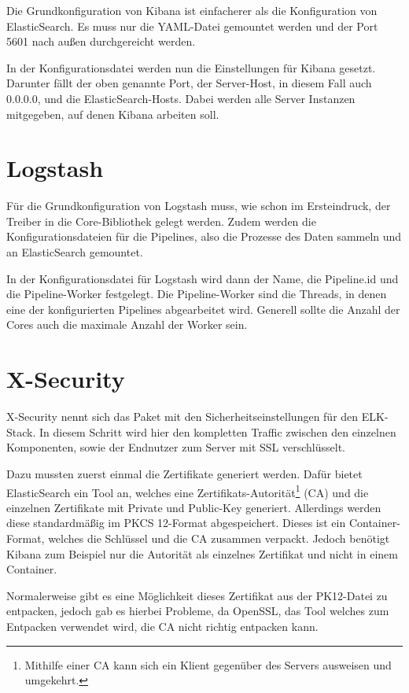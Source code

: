 Die Grundkonfiguration von Kibana ist einfacherer als die Konfiguration von ElasticSearch. Es muss nur die YAML-Datei gemountet werden und der Port 5601 nach außen durchgereicht werden.

In der Konfigurationsdatei werden nun die Einstellungen für Kibana gesetzt. Darunter fällt der oben genannte Port, der Server-Host, in diesem Fall auch 0.0.0.0, und die ElasticSearch-Hosts. Dabei werden alle Server Instanzen mitgegeben, auf denen Kibana arbeiten soll. 

\section{Logstash}

Für die Grundkonfiguration von Logstash muss, wie schon im Ersteindruck, der Treiber in die Core-Bibliothek gelegt werden. Zudem werden die Konfigurationsdateien für die Pipelines, also die Prozesse des Daten sammeln und an ElasticSearch gemountet.

In der Konfigurationsdatei für Logstash wird dann der Name, die Pipeline.id und die Pipeline-Worker festgelegt. Die Pipeline-Worker sind die Threads, in denen eine der konfigurierten Pipelines abgearbeitet wird. Generell sollte die Anzahl der Cores auch die maximale Anzahl der Worker sein.


\section{X-Security}

X-Security nennt sich das Paket mit den Sicherheitseinstellungen für den ELK-Stack. In diesem Schritt wird hier den kompletten Traffic zwischen den einzelnen Komponenten, sowie der Endnutzer zum Server mit SSL verschlüsselt. 

Dazu mussten zuerst einmal die Zertifikate generiert werden. Dafür bietet ElasticSearch ein Tool an, welches eine Zertifikats-Autorität\footnote{Mithilfe einer CA kann sich ein Klient gegenüber des Servers ausweisen und umgekehrt.} (CA) und die einzelnen Zertifikate mit Private und Public-Key generiert. Allerdings werden diese standardmäßig im PKCS 12-Format abgespeichert. Dieses ist ein Container-Format, welches die Schlüssel und die CA zusammen verpackt. Jedoch benötigt Kibana zum Beispiel nur die Autorität als einzelnes Zertifikat und nicht in einem Container.

Normalerweise gibt es eine Möglichkeit dieses Zertifikat aus der PK12-Datei zu entpacken, jedoch gab es hierbei Probleme, da OpenSSL, das Tool welches zum Entpacken verwendet wird, die CA nicht richtig entpacken kann. \cite{nerophon.2018}

